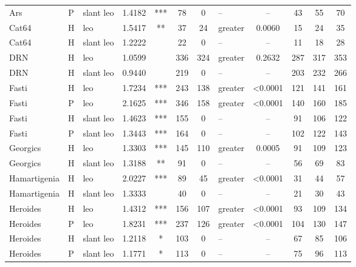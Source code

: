 \documentclass[twocolumn, switch, a4paper]{article} %
\begin{document}
\begin{table}[h!]
\begin{adjustbox}{totalheight=0.9\textheight}
\begin{tabular}{lclcccclcc@{\hspace{1\tabcolsep}}c@{\hspace{1\tabcolsep}}c}
           Ars &     P &  slant leo & 1.4182 &   *** &   78 &         0 &        -- & -- &   43 &   55 &   70 \\
         Cat64 &     H &        leo & 1.5417 &    ** &   37 &        24 &     greater & 0.0060 &   15 &   24 &   35 \\
         Cat64 &     H &  slant leo & 1.2222 &       &   22 &         0 &        -- & -- &   11 &   18 &   28 \\
           DRN &     H &        leo & 1.0599 &       &  336 &       324 &     greater & 0.2632 &  287 &  317 &  353 \\
           DRN &     H &  slant leo & 0.9440 &       &  219 &         0 &        -- & -- &  203 &  232 &  266 \\
         Fasti &     H &        leo & 1.7234 &   *** &  243 &       138 &     greater & <0.0001 &  121 &  141 &  161 \\
         Fasti &     P &        leo & 2.1625 &   *** &  346 &       158 &     greater & <0.0001 &  140 &  160 &  185 \\
         Fasti &     H &  slant leo & 1.4623 &   *** &  155 &         0 &        -- & -- &   91 &  106 &  122 \\
         Fasti &     P &  slant leo & 1.3443 &   *** &  164 &         0 &        -- & -- &  102 &  122 &  143 \\
      Georgics &     H &        leo & 1.3303 &   *** &  145 &       110 &     greater & 0.0005 &   91 &  109 &  123 \\
      Georgics &     H &  slant leo & 1.3188 &    ** &   91 &         0 &        -- & -- &   56 &   69 &   83 \\
  Hamartigenia &     H &        leo & 2.0227 &   *** &   89 &        45 &     greater & <0.0001 &   31 &   44 &   57 \\
  Hamartigenia &     H &  slant leo & 1.3333 &       &   40 &         0 &        -- & -- &   21 &   30 &   43 \\
      Heroides &     H &        leo & 1.4312 &   *** &  156 &       107 &     greater & <0.0001 &   93 &  109 &  134 \\
      Heroides &     P &        leo & 1.8231 &   *** &  237 &       126 &     greater & <0.0001 &  104 &  130 &  147 \\
      Heroides &     H &  slant leo & 1.2118 &     * &  103 &         0 &        -- & -- &   67 &   85 &  106 \\
      Heroides &     P &  slant leo & 1.1771 &     * &  113 &         0 &        -- & -- &   75 &   96 &  113 \\

\end{tabular}
\end{adjustbox}
\end{table}
\end{document}
